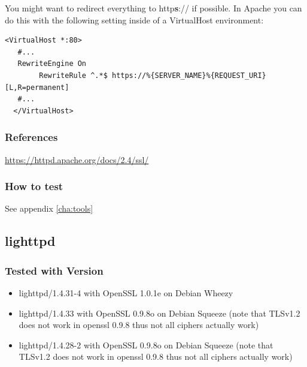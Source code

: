 You might want to redirect everything to http\textbf{s}:// if possible. In Apache you can do this with the following setting inside of a VirtualHost environment:

\begin{lstlisting}[breaklines]
  <VirtualHost *:80>
   #...
   RewriteEngine On
        RewriteRule ^.*$ https://%{SERVER_NAME}%{REQUEST_URI} [L,R=permanent]
   #...
  </VirtualHost>
\end{lstlisting}


\subsubsection{References}
\url{https://httpd.apache.org/docs/2.4/ssl/}


\subsubsection{How to test}

See appendix \ref{cha:tools}



\subsection{lighttpd}


\subsubsection{Tested with Version}
\begin{itemize}
\item lighttpd/1.4.31-4 with OpenSSL 1.0.1e on Debian Wheezy
\item lighttpd/1.4.33 with OpenSSL 0.9.8o on Debian Squeeze (note that TLSv1.2 does not work in openssl 0.9.8 thus not all ciphers actually work)
\item lighttpd/1.4.28-2 with OpenSSL 0.9.8o on Debian Squeeze (note that TLSv1.2 does not work in openssl 0.9.8 thus not all ciphers actually work)
\end{itemize}



